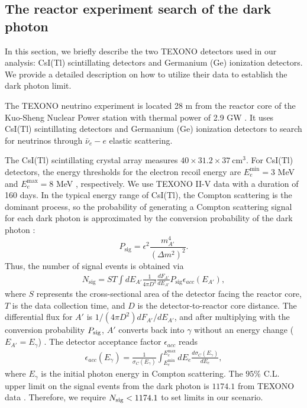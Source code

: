 \documentclass[prd,showpacs,preprintnumbers,amsmath,amssymb,twocolumn,superscriptaddress,notitlepage]{revtex4-2}
\begin{document}
\begin{widetext}
\section{The reactor experiment search of the dark photon}
\label{appsec: reactor search}



In this section, we briefly describe the two TEXONO detectors used in our analysis: CsI(Tl) scintillating detectors and Germanium (Ge) ionization detectors. 
We provide a detailed description on how to utilize their data to establish the dark photon limit.

The TEXONO neutrino experiment is located 28 m from the reactor core of the Kuo-Sheng Nuclear Power station with thermal power of 2.9 GW \cite{TEXONO:2000zzq}. It uses CsI(Tl) scintillating detectors \cite{TEXONO:2000zzq} and Germanium (Ge) ionization detectors \cite{TEXONO:2014eky} to search for neutrinos through $\bar{\nu}_e-e$ elastic scattering.


The CsI(Tl) scintillating crystal array measures $40 \times 31.2 \times 37~ \text{cm}^3$.
For CsI(Tl) detectors,
the energy thresholds for the electron recoil energy are $E_e^{\min} = 3$ MeV and $E_e^{\max} = 8$ MeV \cite{TEXONO:2009knm}, respectively.
We use TEXONO II-V data with a duration of 160 days.
%
In the typical energy range of CsI(Tl), the Compton scattering is the dominant process, 
so the probability of generating a Compton scattering signal for each dark photon is approximated by 
the conversion probability of the dark photon  \cite{Danilov:2018bks}:
\begin{equation}
P_{\text{sig}} = \epsilon^2 \frac{m_{A'}^4}{(\Delta m^2)^2}.
\label{eq:Aptogamma}
\end{equation}
Thus, the number of signal events is obtained via 
\begin{align}
N_{\text{sig}} = S T  \int dE_{A'}  \frac{1}{4\pi D^2} \frac{dF_{A'}}{dE_{A'}} P_{\text{sig}} \epsilon_{acc}(E_{A'}), 
\label{eq:NsigEvents}
\end{align}
where $S$ represents the cross-sectional area of the detector facing the reactor core, $T$ is the data collection time, and $D$ is the detector-to-reactor core distance. 
The differential flux for $A'$ is $1/(4\pi D^2) dF_{A'}/dE_{A'} $,
and after multiplying with the conversion probability $P_{\rm sig}$, $A'$ converts back into $\gamma$ without an energy change ($E_{A'} = E_\gamma$) \cite{Danilov:2018bks}.
% 
The detector acceptance factor $\epsilon_{acc}$ reads
\begin{align}
    \epsilon_{acc}(E_{\gamma}) = \frac{1}{\sigma_C(E_{\gamma})}\int^{E_e^{\max}}_{E_e^{\min}} d E_e \frac{d\sigma_C(E_\gamma)}{dE_e},
\end{align}
where $E_\gamma$ is the initial photon energy in Compton scattering. 
The $95\%$ C.L. upper limit on the signal events from the dark photon is $1174.1$ from TEXONO data \cite{TEXONO:2009knm}.
Therefore, we require $ N_{\rm sig} < 1174.1$ to set limits in our scenario. 




\end{widetext}
\end{document}
